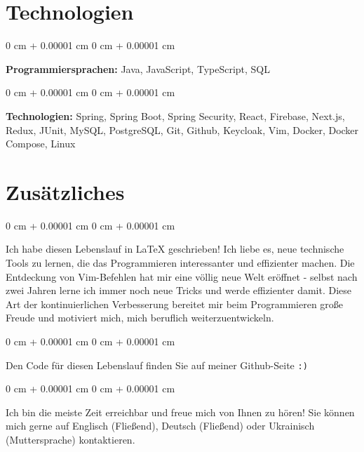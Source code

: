 \documentclass[10pt, letterpaper]{article}
\newenvironment{onecolentry}{
    \begin{adjustwidth}{
        0 cm + 0.00001 cm
    }{
        0 cm + 0.00001 cm
    }
}{
    \end{adjustwidth}
} %
\begin{document}
    \section{Technologien}
        \begin{onecolentry}
            \textbf{Programmiersprachen:} Java, JavaScript, TypeScript, SQL
        \end{onecolentry}

        \vspace{0.2 cm}

        \begin{onecolentry}
            \textbf{Technologien:} Spring, Spring Boot, Spring Security, React, Firebase, Next.js, Redux, JUnit, MySQL, PostgreSQL, Git, Github, Keycloak, Vim, Docker, Docker Compose, Linux
        \end{onecolentry}

    \section{Zusätzliches}

    \begin{onecolentry}
        Ich habe diesen Lebenslauf in \LaTeX{} geschrieben! Ich liebe es, neue technische Tools zu lernen, die das Programmieren interessanter und effizienter machen. Die Entdeckung von Vim-Befehlen hat mir eine völlig neue Welt eröffnet - selbst nach zwei Jahren lerne ich immer noch neue Tricks und werde effizienter damit. Diese Art der kontinuierlichen Verbesserung bereitet mir beim Programmieren große Freude und motiviert mich, mich beruflich weiterzuentwickeln.
    \end{onecolentry}

    \vspace{0.1 cm}
    \begin{onecolentry}
        Den Code für diesen Lebenslauf finden Sie auf meiner Github-Seite \texttt{:)}
    \end{onecolentry}

    \vspace{0.1 cm}
    \begin{onecolentry}
    Ich bin die meiste Zeit erreichbar und freue mich von Ihnen zu hören! Sie können mich gerne auf Englisch (Fließend), Deutsch (Fließend) oder Ukrainisch (Muttersprache) kontaktieren.
    \end{onecolentry}
\end{document}
